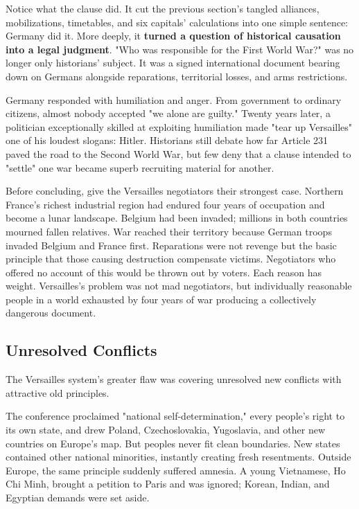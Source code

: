 Notice what the clause did. It cut the previous section's tangled alliances, mobilizations, timetables, and six capitals' calculations into one simple sentence: Germany did it. More deeply, it \textbf{turned a question of historical causation into a legal judgment}. "Who was responsible for the First World War?" was no longer only historians' subject. It was a signed international document bearing down on Germans alongside reparations, territorial losses, and arms restrictions.

Germany responded with humiliation and anger. From government to ordinary citizens, almost nobody accepted "we alone are guilty." Twenty years later, a politician exceptionally skilled at exploiting humiliation made "tear up Versailles" one of his loudest slogans: Hitler. Historians still debate how far Article 231 paved the road to the Second World War, but few deny that a clause intended to "settle" one war became superb recruiting material for another.

Before concluding, give the Versailles negotiators their strongest case. Northern France's richest industrial region had endured four years of occupation and become a lunar landscape. Belgium had been invaded; millions in both countries mourned fallen relatives. War reached their territory because German troops invaded Belgium and France first. Reparations were not revenge but the basic principle that those causing destruction compensate victims. Negotiators who offered no account of this would be thrown out by voters. Each reason has weight. Versailles's problem was not mad negotiators, but individually reasonable people in a world exhausted by four years of war producing a collectively dangerous document.

\subsection{Unresolved Conflicts}
The Versailles system's greater flaw was covering unresolved new conflicts with attractive old principles.

The conference proclaimed "national self-determination," every people's right to its own state, and drew Poland, Czechoslovakia, Yugoslavia, and other new countries on Europe's map. But peoples never fit clean boundaries. New states contained other national minorities, instantly creating fresh resentments. Outside Europe, the same principle suddenly suffered amnesia. A young Vietnamese, Ho Chi Minh, brought a petition to Paris and was ignored; Korean, Indian, and Egyptian demands were set aside.

